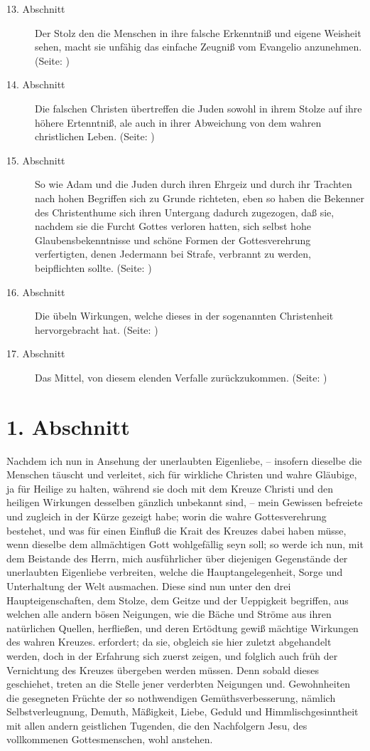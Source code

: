 \begin{description}
\item[13. Abschnitt] Der Stolz den die Menschen in ihre falsche Erkenntniß und
eigene Weisheit sehen, macht sie unfähig das einfache Zeugniß vom Evangelio
anzunehmen. (Seite: \pageref{kap7_ab13})
\item[14. Abschnitt] Die falschen Christen übertreffen die Juden sowohl in ihrem
Stolze auf ihre höhere Ertenntniß, ale auch in ihrer Abweichung von dem wahren
christlichen Leben. (Seite: \pageref{kap7_ab14})
\item[15. Abschnitt] So wie Adam und die Juden durch ihren Ehrgeiz und durch ihr
Trachten nach hohen Begriffen sich zu Grunde richteten, eben so haben die
Bekenner des Christenthume sich ihren Untergang dadurch zugezogen, daß sie,
nachdem sie die Furcht Gottes verloren hatten, sich selbst hohe
Glaubensbekenntnisse und schöne Formen der Gottesverehrung verfertigten, denen
Jedermann bei Strafe, verbrannt zu werden, beipflichten sollte. (Seite: \pageref{kap7_ab15})
\item[16. Abschnitt] Die übeln Wirkungen, welche dieses in der sogenannten
Christenheit hervorgebracht hat. (Seite: \pageref{kap7_ab16})
\item[17. Abschnitt] Das Mittel, von diesem elenden Verfalle zurückzukommen. (Seite: \pageref{kap7_ab17})

\end{description}
\normalsize


\section{1. Abschnitt} \label{kap7_ab1}

Nachdem ich nun in Ansehung der unerlaubten Eigenliebe, -- insofern dieselbe die
Menschen täuscht und verleitet, sich für wirkliche Christen und wahre Gläubige,
ja für Heilige zu halten, während sie doch mit dem Kreuze Christi und den
heiligen Wirkungen desselben gänzlich unbekannt sind, -- mein Gewissen befreiete
und zugleich in der Kürze gezeigt habe; worin die wahre Gottesverehrung
bestehet, und was für einen Einfluß die Krait des Kreuzes dabei haben müsse,
wenn dieselbe dem allmächtigen Gott wohlgefällig seyn soll; so werde ich nun,
mit dem Beistande des Herrn, mich ausführlicher über diejenigen Gegenstände der
unerlaubten Eigenliebe verbreiten, welche die Hauptangelegenheit, Sorge und
Unterhaltung der Welt ausmachen. Diese sind nun unter den drei
Haupteigenschaften, dem Stolze, dem Geitze und der Ueppigkeit begriffen, aus
welchen alle andern bösen Neigungen, wie die Bäche und Ströme aus ihren
natürlichen Quellen, herfließen, und deren Ertödtung gewiß mächtige Wirkungen
des wahren Kreuzes. erfordert; da sie, obgleich sie hier zuletzt abgehandelt
werden, doch in der Erfahrung sich zuerst zeigen, und folglich auch früh der
Vernichtung des Kreuzes übergeben werden müssen. Denn sobald dieses geschiehet,
treten an die Stelle jener verderbten Neigungen und. Gewohnheiten die gesegneten
Früchte der so nothwendigen Gemüthsverbesserung, nämlich Selbstverleugnung,
Demuth, Mäßigkeit, Liebe, Geduld und Himmlischgesinntheit mit allen andern
geistlichen Tugenden, die den Nachfolgern Jesu, des vollkommenen Gottesmenschen,
wohl anstehen.



